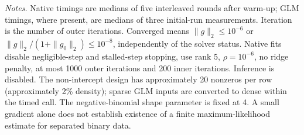\documentclass[10pt,a4paper]{article}
\begin{document}
\noindent\textit{Notes.} Native timings are medians of five interleaved rounds after warm-up; GLM timings, where present, are medians of three initial-run measurements. Iteration is the number of outer iterations. Converged means $\|g\|_2\leq10^{-6}$ or $\|g\|_2/(1+\|g_0\|_2)\leq10^{-8}$, independently of the solver status. Native fits disable negligible-step and stalled-step stopping, use rank 5, $\rho=10^{-6}$, no ridge penalty, at most 1000 outer iterations and 200 inner iterations. Inference is disabled.
The non-intercept design has approximately 20 nonzeros per row (approximately 2\% density); sparse GLM inputs are converted to dense within the timed call.
The negative-binomial shape parameter is fixed at 4. A small gradient alone does not establish existence of a finite maximum-likelihood estimate for separated binary data.
\par
\endgroup
\end{document}
